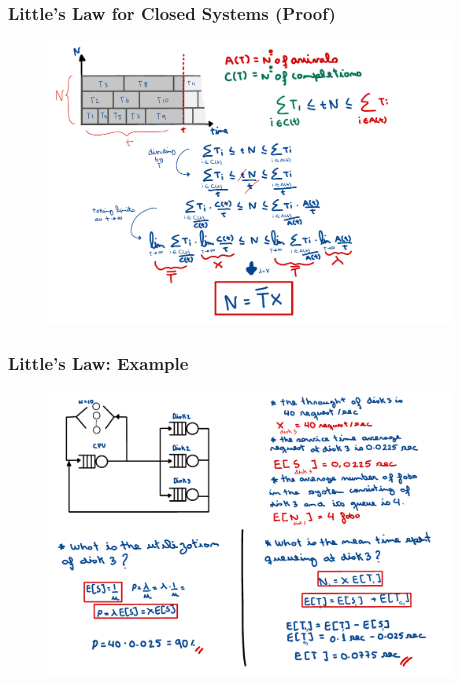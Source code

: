 \begin{frame}
    \frametitle{Little's Law for Closed Systems (Proof)}
    \begin{figure}
        \centering
        \includegraphics[width=0.95\textwidth]{slides/figures/little_law_closed_proof.pdf}
    \end{figure}
\end{frame}



\begin{frame}
    \frametitle{Little's Law: Example}
    \begin{figure}
        \centering
        \includegraphics[width=0.95\textwidth]{slides/figures/little_law_closed_example.pdf}
    \end{figure}
\end{frame}



